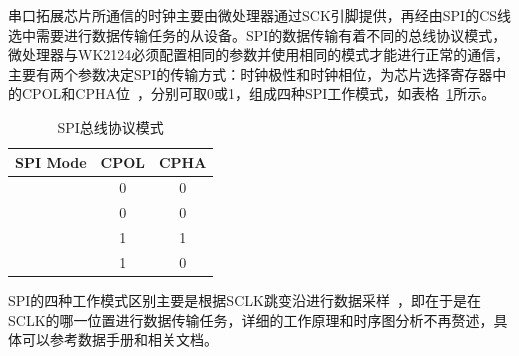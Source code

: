 串口拓展芯片所通信的时钟主要由微处理器通过SCK引脚提供，再经由SPI的CS线选中需要进行数据传输任务的从设备。SPI的数据传输有着不同的总线协议模式，微处理器与WK2124必须配置相同的参数并使用相同的模式才能进行正常的通信，主要有两个参数决定SPI的传输方式：时钟极性和时钟相位，为芯片选择寄存器中的CPOL和CPHA位~\cite{2009zw}，分别可取0或1，组成四种SPI工作模式，如表格~\ref{tab:SPI总线协议模式}所示。

\begin{table}[ht]
\caption{SPI总线协议模式}
  \label{tab:SPI总线协议模式}
\centering
    \begin{tabular}{|c|c|c|}
        \toprule
 {\bf SPI Mode}&{\bf CPOL} & {\bf CPHA}  \\      
        \hline
[0]& {0} & {0}\\
        \hline
[1]& {0} & {0}\\
\hline
[2]& {1} & {1}\\
\hline
[3]& {1} & {0}\\
        \bottomrule
    \end{tabular}
\end{table}
SPI的四种工作模式区别主要是根据SCLK跳变沿进行数据采样~\cite{2006zxj}，即在于是在SCLK的哪一位置进行数据传输任务，详细的工作原理和时序图分析不再赘述，具体可以参考数据手册和相关文档。

